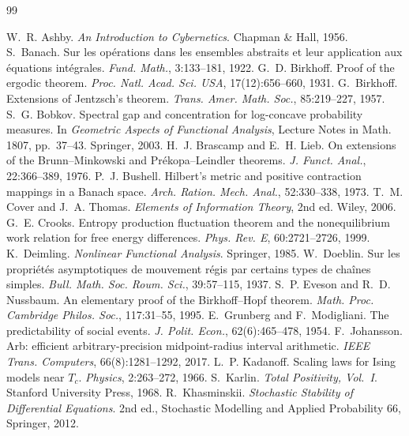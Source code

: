 \documentclass[11pt]{article}
\theoremstyle{plain}
\theoremstyle{definition}
\theoremstyle{remark}
\begin{document}
\begin{thebibliography}{99}

 W.~R. Ashby. \emph{An Introduction to Cybernetics}. Chapman \& Hall, 1956.
 S.~Banach. Sur les op\'erations dans les ensembles abstraits et leur application aux \'equations int\'egrales. \emph{Fund. Math.}, 3:133--181, 1922.
 G.~D. Birkhoff. Proof of the ergodic theorem. \emph{Proc. Natl. Acad. Sci. USA}, 17(12):656--660, 1931.
 G.~Birkhoff. Extensions of Jentzsch's theorem. \emph{Trans. Amer. Math. Soc.}, 85:219--227, 1957.
 S.~G. Bobkov. Spectral gap and concentration for log-concave probability measures. In \emph{Geometric Aspects of Functional Analysis}, Lecture Notes in Math. 1807, pp.~37--43. Springer, 2003.
 H.~J. Brascamp and E.~H. Lieb. On extensions of the Brunn--Minkowski and Pr\'ekopa--Leindler theorems. \emph{J. Funct. Anal.}, 22:366--389, 1976.
 P.~J. Bushell. Hilbert's metric and positive contraction mappings in a Banach space. \emph{Arch. Ration. Mech. Anal.}, 52:330--338, 1973.
 T.~M. Cover and J.~A. Thomas. \emph{Elements of Information Theory}, 2nd ed. Wiley, 2006.
 G.~E. Crooks. Entropy production fluctuation theorem and the nonequilibrium work relation for free energy differences. \emph{Phys. Rev. E}, 60:2721--2726, 1999.
 K.~Deimling. \emph{Nonlinear Functional Analysis}. Springer, 1985.
 W.~Doeblin. Sur les propri\'et\'es asymptotiques de mouvement r\'egis par certains types de cha\^ines simples. \emph{Bull. Math. Soc. Roum. Sci.}, 39:57--115, 1937.
 S.~P. Eveson and R.~D. Nussbaum. An elementary proof of the Birkhoff--Hopf theorem. \emph{Math. Proc. Cambridge Philos. Soc.}, 117:31--55, 1995.
 E.~Grunberg and F.~Modigliani. The predictability of social events. \emph{J. Polit. Econ.}, 62(6):465--478, 1954.
 F.~Johansson. Arb: efficient arbitrary-precision midpoint-radius interval arithmetic. \emph{IEEE Trans. Computers}, 66(8):1281--1292, 2017.
 L.~P. Kadanoff. Scaling laws for Ising models near $T_c$. \emph{Physics}, 2:263--272, 1966.
 S.~Karlin. \emph{Total Positivity, Vol.~I}. Stanford University Press, 1968.
 R.~Khasminskii. \emph{Stochastic Stability of Differential Equations}. 2nd ed., Stochastic Modelling and Applied Probability 66, Springer, 2012.

\end{thebibliography}
\end{document}
